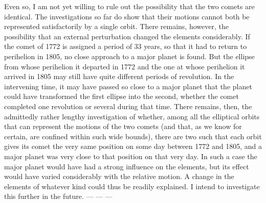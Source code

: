 \par\indent Even so, I am not yet willing to rule out the possibility that the two comets are identical. The investigations so far do show that their motions cannot both be represented satisfactorily by a single orbit. There remains, however, the possibility that an external perturbation changed the elements considerably. If the comet of 1772 is assigned a period of 33 years, so that it had to return to perihelion in 1805, no close approach to a major planet is found. But the ellipse from whose perihelion it departed in 1772 and the one at whose perihelion it arrived in 1805 may still have quite different periods of revolution. In the intervening time, it may have passed so close to a major planet that the planet could have transformed the first ellipse into the second, whether the comet completed one revolution or several during that time. There remains, then, the admittedly rather lengthy investigation of whether, among all the elliptical orbits that can represent the motions of the two comets (and that, as we know for certain, are confined within such wide bounds), there are two such that each orbit gives its comet the very same position on some day between 1772 and 1805, and a major planet was very close to that position on that very day. In such a case the major planet would have had a strong
%
influence on the elements, but its effect would have varied considerably with the relative motion. A change in the elements of whatever kind could thus be readily explained. I intend to investigate this further in the future. --- --- ---